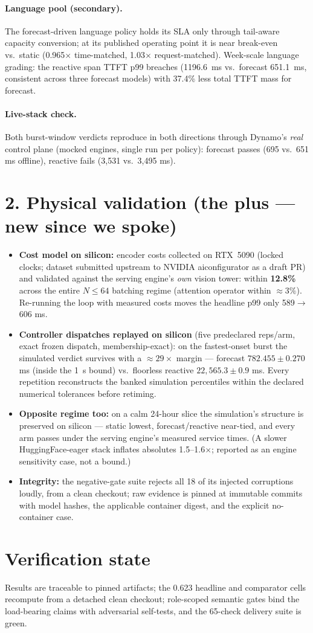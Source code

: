 \documentclass[11pt,a4paper]{article}
\begin{document}
\paragraph{Language pool (secondary).} The forecast-driven language policy
holds its SLA only through tail-aware capacity conversion; at its
published operating point it is near break-even vs.\ static
(0.965$\times$ time-matched, 1.03$\times$ request-matched). Week-scale
language grading: the reactive span TTFT p99 breaches
(\SI{1196.6}{\milli\second} vs.\ forecast \SI{651.1}{\milli\second},
consistent across three forecast models) with 37.4\% less total TTFT
mass for forecast.

\paragraph{Live-stack check.} Both burst-window verdicts reproduce in both
directions through Dynamo's \emph{real} control plane (mocked engines, single run
per policy):
forecast passes (695 vs.\ 651 ms offline), reactive fails (3{,}531 vs.\
3{,}495 ms).

\section*{2. Physical validation (the plus --- new since we spoke)}

\begin{itemize}
\item \textbf{Cost model on silicon:} encoder costs collected on RTX~5090
  (locked clocks; dataset submitted upstream to NVIDIA aiconfigurator as a
  draft PR) and validated against the serving engine's \emph{own} vision
  tower: within \textbf{12.8\%} across the entire $N\le64$ batching
  regime (attention operator within ${\approx}3\%$). Re-running the loop
  with measured costs moves the headline p99 only 589$\to$606 ms.
\item \textbf{Controller dispatches replayed on silicon} (five predeclared
  reps/arm, exact frozen dispatch, membership-exact): on the fastest-onset
  burst the simulated verdict survives with a ${\approx}29\times$ margin
  --- forecast $782.455\pm0.270$ ms (inside the \SI{1}{\second} bound)
  vs.\ floorless reactive $22{,}565.3\pm0.9$ ms. Every repetition
  reconstructs the banked simulation percentiles within the declared
  numerical tolerances before retiming.
\item \textbf{Opposite regime too:} on a calm 24-hour slice the
  simulation's structure is preserved on silicon --- static lowest,
  forecast/reactive near-tied, and every arm passes under the serving
  engine's measured service times. (A slower HuggingFace-eager stack
  inflates absolutes 1.5--1.6$\times$; reported as an engine sensitivity
  case, not a bound.)
\item \textbf{Integrity:} the negative-gate suite rejects all 18 of its
  injected corruptions loudly, from a clean checkout; raw evidence is
  pinned at immutable commits with model hashes, the applicable container
  digest, and the explicit no-container case.
\end{itemize}

\section*{Verification state}
Results are traceable to pinned artifacts; the 0.623 headline and
comparator cells recompute from a detached clean checkout; role-scoped
semantic gates bind the load-bearing claims with adversarial self-tests,
and the 65-check delivery suite is green.
\end{document}
